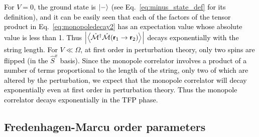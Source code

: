 \documentclass[twocolumn,superscriptaddress,amsmath,amssymb,aps,prx,nofootinbib]{revtex4-2}
\newcommand{\dual}[1]{\boldsymbol{\mathsf{#1}}}
\newcommand{\newtext}[1]{\textcolor{black}{#1}}
\begin{document}
\newtext{For $V=0$, the ground state is $\ket{-}$ (see Eq.~\eqref{eq:minus_state_def} for its definition), and it can be easily seen that each of the factors of the tensor product in Eq.~\eqref{eq:monopoledecay2} has an expectation value whose absolute value is less than 1.
Thus $\abs{\expval{\hat{\mathcal{M}}^\dagger \hat{\mathcal{M}} (\dual{r}_1\rightarrow \dual{r}_2)}}$ decays exponentially with the string length. For $V \ll \Omega$, at first order in perturbation theory, only two spins are flipped (in the $\hat{S}^x$ basis). Since the monopole correlator involves a product of a number of terms proportional to the length of the string, only two of which are altered by the perturbation, we expect that the monopole correlator will decay exponentially even at first order in perturbation theory. 
Thus the monopole correlator decays exponentially in the TFP phase. }\\

\subsection{Fredenhagen-Marcu order parameters} \label{sec:fm_order_param}
\end{document}
